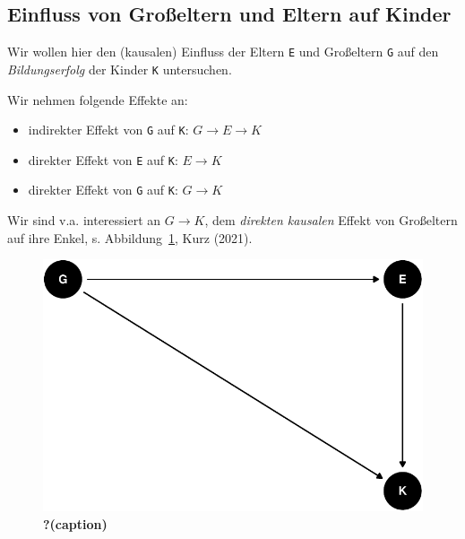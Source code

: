 \documentclass[
  a4paper,
  DIV=11]{scrreprt}
\providecommand{\tightlist}{%
  \setlength{\itemsep}{0pt}\setlength{\parskip}{0pt}}\usepackage{longtable,booktabs,array}
\theoremstyle{definition}
\theoremstyle{remark}
\begin{document}
\hypertarget{einfluss-von-grouxdfeltern-und-eltern-auf-kinder}{%
\subsection{Einfluss von Großeltern und Eltern auf
Kinder}\label{einfluss-von-grouxdfeltern-und-eltern-auf-kinder}}

Wir wollen hier den (kausalen) Einfluss der Eltern \texttt{E} und
Großeltern \texttt{G} auf den \emph{Bildungserfolg} der Kinder
\texttt{K} untersuchen.

Wir nehmen folgende Effekte an:

\begin{itemize}
\tightlist
\item
  indirekter Effekt von \texttt{G} auf \texttt{K}:
  \(G \rightarrow E \rightarrow K\)
\item
  direkter Effekt von \texttt{E} auf \texttt{K}: \(E \rightarrow K\)
\item
  direkter Effekt von \texttt{G} auf \texttt{K}: \(G \rightarrow K\)
\end{itemize}

Wir sind v.a. interessiert an \(G \rightarrow K\), dem \emph{direkten
kausalen} Effekt von Großeltern auf ihre Enkel, s.
Abbildung~\ref{fig-dag-grannies}, Kurz (2021).

\begin{figure}

{\centering \includegraphics{./kausal_files/figure-pdf/fig-dag-grannies-1.pdf}

}

\caption{\label{fig-dag-grannies}\textbf{?(caption)}}

\end{figure}
\end{document}
